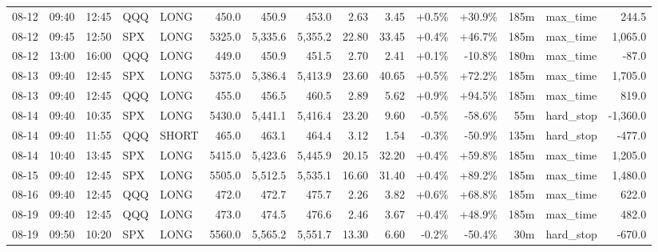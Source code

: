 \documentclass[11pt,a4paper,twoside]{article}
\begin{document}
\begin{landscape}
\begin{center}
\begin{longtable}{>{\color{txtmain}}l l l l l r r r r r r r r >{\color{txtmain}}l r}
08-12 & 09:40 & 12:45 & QQQ & LONG & 450.0 & 450.9 & 453.0 & 2.63 & 3.45 & \textcolor{wingreen}{+0.5\%} & \textcolor{wingreen}{+30.9\%} & 185m & max\_time & \textcolor{wingreen}{244.5} \\
08-12 & 09:45 & 12:50 & SPX & LONG & 5325.0 & 5,335.6 & 5,355.2 & 22.80 & 33.45 & \textcolor{wingreen}{+0.4\%} & \textcolor{wingreen}{+46.7\%} & 185m & max\_time & \textcolor{wingreen}{1,065.0} \\
08-12 & 13:00 & 16:00 & QQQ & LONG & 449.0 & 450.9 & 451.5 & 2.70 & 2.41 & \textcolor{wingreen}{+0.1\%} & \textcolor{lossred}{-10.8\%} & 180m & max\_time & \textcolor{lossred}{-87.0} \\
08-13 & 09:40 & 12:45 & SPX & LONG & 5375.0 & 5,386.4 & 5,413.9 & 23.60 & 40.65 & \textcolor{wingreen}{+0.5\%} & \textcolor{wingreen}{+72.2\%} & 185m & max\_time & \textcolor{wingreen}{1,705.0} \\
08-13 & 09:40 & 12:45 & QQQ & LONG & 455.0 & 456.5 & 460.5 & 2.89 & 5.62 & \textcolor{wingreen}{+0.9\%} & \textcolor{wingreen}{+94.5\%} & 185m & max\_time & \textcolor{wingreen}{819.0} \\
08-14 & 09:40 & 10:35 & SPX & LONG & 5430.0 & 5,441.1 & 5,416.4 & 23.20 & 9.60 & \textcolor{lossred}{-0.5\%} & \textcolor{lossred}{-58.6\%} & 55m & hard\_stop & \textcolor{lossred}{-1,360.0} \\
08-14 & 09:40 & 11:55 & QQQ & SHORT & 465.0 & 463.1 & 464.4 & 3.12 & 1.54 & \textcolor{lossred}{-0.3\%} & \textcolor{lossred}{-50.9\%} & 135m & hard\_stop & \textcolor{lossred}{-477.0} \\
08-14 & 10:40 & 13:45 & SPX & LONG & 5415.0 & 5,423.6 & 5,445.9 & 20.15 & 32.20 & \textcolor{wingreen}{+0.4\%} & \textcolor{wingreen}{+59.8\%} & 185m & max\_time & \textcolor{wingreen}{1,205.0} \\
08-15 & 09:40 & 12:45 & SPX & LONG & 5505.0 & 5,512.5 & 5,535.1 & 16.60 & 31.40 & \textcolor{wingreen}{+0.4\%} & \textcolor{wingreen}{+89.2\%} & 185m & max\_time & \textcolor{wingreen}{1,480.0} \\
08-16 & 09:40 & 12:45 & QQQ & LONG & 472.0 & 472.7 & 475.7 & 2.26 & 3.82 & \textcolor{wingreen}{+0.6\%} & \textcolor{wingreen}{+68.8\%} & 185m & max\_time & \textcolor{wingreen}{622.0} \\
08-19 & 09:40 & 12:45 & QQQ & LONG & 473.0 & 474.5 & 476.6 & 2.46 & 3.67 & \textcolor{wingreen}{+0.4\%} & \textcolor{wingreen}{+48.9\%} & 185m & max\_time & \textcolor{wingreen}{482.0} \\
08-19 & 09:50 & 10:20 & SPX & LONG & 5560.0 & 5,565.2 & 5,551.7 & 13.30 & 6.60 & \textcolor{lossred}{-0.2\%} & \textcolor{lossred}{-50.4\%} & 30m & hard\_stop & \textcolor{lossred}{-670.0} \\

\end{longtable}
\end{center}
\end{landscape}
\end{document}
